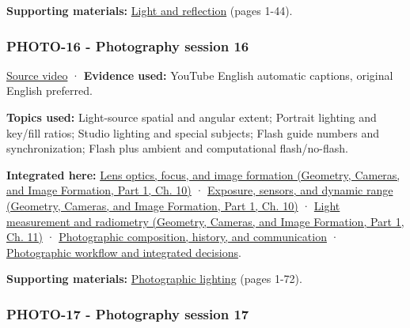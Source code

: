 \textbf{Supporting materials:} \href{https://drive.google.com/open?id=0B6w2XfPHEcZYNHdYdjhMakktS28}{Light and reflection} (pages 1-44).

\subsubsection{PHOTO-16 - Photography session 16}\label{04-visual-computing-ii-ch036-photo-16---photography-session-16}

\hypertarget{04-visual-computing-ii-ch036-photo-16---photography-session-16}{}

\href{https://www.youtube.com/watch?v=gy-6WhxVIqc}{Source video} · \textbf{Evidence used:} YouTube English automatic captions, original English preferred.

\textbf{Topics used:} Light-source spatial and angular extent; Portrait lighting and key/fill ratios; Studio lighting and special subjects; Flash guide numbers and synchronization; Flash plus ambient and computational flash/no-flash.

\textbf{Integrated here:} \href{../03-Geometry-Cameras-and-Image-Formation-P01/main.pdf\#nameddest=03-visual-computing-i-ch003-lens-optics-focus-and-image-formation}{Lens optics, focus, and image formation (Geometry, Cameras, and Image Formation, Part 1, Ch. 10)} · \href{../03-Geometry-Cameras-and-Image-Formation-P01/main.pdf\#nameddest=03-visual-computing-i-ch003-exposure-sensors-and-dynamic-range}{Exposure, sensors, and dynamic range (Geometry, Cameras, and Image Formation, Part 1, Ch. 10)} · \href{../03-Geometry-Cameras-and-Image-Formation-P01/main.pdf\#nameddest=03-visual-computing-i-ch004-light-measurement-and-radiometry}{Light measurement and radiometry (Geometry, Cameras, and Image Formation, Part 1, Ch. 11)} · \hyperref[04-visual-computing-ii-ch034-photographic-composition-history-and-communication]{Photographic composition, history, and communication} · \hyperref[04-visual-computing-ii-ch034-photographic-workflow-and-integrated-decisions]{Photographic workflow and integrated decisions}.

\textbf{Supporting materials:} \href{https://drive.google.com/open?id=0B6w2XfPHEcZYN1dYTWZndkZDNVE}{Photographic lighting} (pages 1-72).

\subsubsection{PHOTO-17 - Photography session 17}\label{04-visual-computing-ii-ch036-photo-17---photography-session-17}

